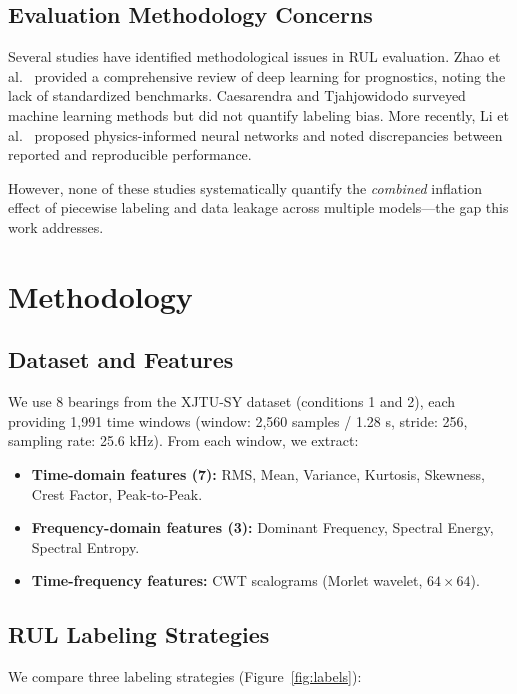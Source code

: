 \documentclass[5p,twocolumn]{elsarticle}
\begin{document}
\subsection{Evaluation Methodology Concerns}

Several studies have identified methodological issues in RUL evaluation. Zhao et al.\ \cite{zhao2021deep} provided a comprehensive review of deep learning for prognostics, noting the lack of standardized benchmarks. Caesarendra and Tjahjowidodo \cite{caesarendra2021machine} surveyed machine learning methods but did not quantify labeling bias. More recently, Li et al.\ \cite{li2022physics} proposed physics-informed neural networks and noted discrepancies between reported and reproducible performance.

However, none of these studies systematically quantify the \emph{combined} inflation effect of piecewise labeling and data leakage across multiple models---the gap this work addresses.


\section{Methodology}
\label{sec:method}

\subsection{Dataset and Features}

We use 8 bearings from the XJTU-SY dataset \cite{xjtusy2019dataset} (conditions 1 and 2), each providing 1,991 time windows (window: 2,560 samples / 1.28 s, stride: 256, sampling rate: 25.6 kHz). From each window, we extract:

\begin{itemize}
    \item \textbf{Time-domain features (7):} RMS, Mean, Variance, Kurtosis, Skewness, Crest Factor, Peak-to-Peak.
    \item \textbf{Frequency-domain features (3):} Dominant Frequency, Spectral Energy, Spectral Entropy.
    \item \textbf{Time-frequency features:} CWT scalograms (Morlet wavelet, $64 \times 64$).
\end{itemize}

\subsection{RUL Labeling Strategies}

We compare three labeling strategies (Figure~\ref{fig:labels}):
\end{document}
